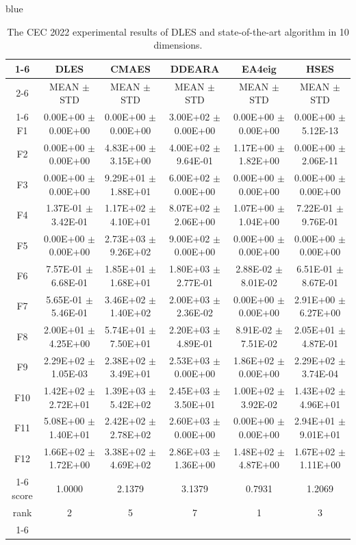 \documentclass[journal, onecolumn]{IEEEtran}
\begin{document}
\begin{color}{blue}
\begin{table}[htbp!]
	\centering
	\caption{The CEC 2022 experimental results of DLES and state-of-the-art algorithm in 10 dimensions.}
	\label{CEC2022_10}
		\begin{tabular}{c|ccccc}
			\cline{1-6}
				 &	DLES			 &	CMAES				 &	DDEARA				 &	EA4eig				 &	HSES			\\	\cline{2-6}	
			&	MEAN	$\pm$	STD	 &	MEAN	$\pm$	STD		 &	MEAN	$\pm$	STD		 &	MEAN	$\pm$	STD		 &	MEAN	$\pm$	STD	\\	\cline{1-6}
			F1	 &	0.00E+00	$\pm$	0.00E+00	 &	0.00E+00	$\pm$	0.00E+00		 &	3.00E+02	$\pm$	0.00E+00		 &	0.00E+00	$\pm$	0.00E+00		 &	0.00E+00	$\pm$	5.12E-13	\\	
			F2	 &	0.00E+00	$\pm$	0.00E+00	 &	4.83E+00	$\pm$	3.15E+00		 &	4.00E+02	$\pm$	9.64E-01		 &	1.17E+00	$\pm$	1.82E+00		 &	0.00E+00	$\pm$	2.06E-11	\\	
			F3	 &	0.00E+00	$\pm$	0.00E+00	 &	9.29E+01	$\pm$	1.88E+01		 &	6.00E+02	$\pm$	0.00E+00		 &	0.00E+00	$\pm$	0.00E+00		 &	0.00E+00	$\pm$	0.00E+00	\\	
			F4	 &	1.37E-01	$\pm$	3.42E-01	 &	1.17E+02	$\pm$	4.10E+01		 &	8.07E+02	$\pm$	2.06E+00		 &	1.07E+00	$\pm$	1.04E+00		 &	7.22E-01	$\pm$	9.76E-01	\\	
			F5	 &	0.00E+00	$\pm$	0.00E+00	 &	2.73E+03	$\pm$	9.26E+02		 &	9.00E+02	$\pm$	0.00E+00		 &	0.00E+00	$\pm$	0.00E+00		 &	0.00E+00	$\pm$	0.00E+00	\\	
			F6	 &	7.57E-01	$\pm$	6.68E-01	 &	1.85E+01	$\pm$	1.68E+01		 &	1.80E+03	$\pm$	2.77E-01		 &	2.88E-02	$\pm$	8.01E-02		 &	6.51E-01	$\pm$	8.67E-01	\\	
			F7	 &	5.65E-01	$\pm$	5.46E-01	 &	3.46E+02	$\pm$	1.40E+02		 &	2.00E+03	$\pm$	2.36E-02		 &	0.00E+00	$\pm$	0.00E+00		 &	2.91E+00	$\pm$	6.27E+00	\\	
			F8	 &	2.00E+01	$\pm$	4.25E+00	 &	5.74E+01	$\pm$	7.50E+01		 &	2.20E+03	$\pm$	4.89E-01		 &	8.91E-02	$\pm$	7.51E-02		 &	2.05E+01	$\pm$	4.87E-01	\\	
			F9	 &	2.29E+02	$\pm$	1.05E-03	 &	2.38E+02	$\pm$	3.49E+01		 &	2.53E+03	$\pm$	0.00E+00		 &	1.86E+02	$\pm$	0.00E+00		 &	2.29E+02	$\pm$	3.74E-04	\\	
			F10	 &	1.42E+02	$\pm$	2.72E+01	 &	1.39E+03	$\pm$	5.42E+02		 &	2.45E+03	$\pm$	3.50E+01		 &	1.00E+02	$\pm$	3.92E-02		 &	1.43E+02	$\pm$	4.96E+01	\\	
			F11	 &	5.08E+00	$\pm$	1.40E+01	 &	2.42E+02	$\pm$	2.78E+02		 &	2.60E+03	$\pm$	0.00E+00		 &	0.00E+00	$\pm$	0.00E+00		 &	2.94E+01	$\pm$	9.01E+01	\\	
			F12	 &	1.66E+02	$\pm$	1.72E+00	 &	3.38E+02	$\pm$	4.69E+02		 &	2.86E+03	$\pm$	1.36E+00		 &	1.48E+02	$\pm$	4.87E+00		 &	1.67E+02	$\pm$	1.11E+00	\\	\cline{1-6}	
			score		& 1.0000 & 2.1379 & 3.1379 & 0.7931 & 1.2069											\\												
			rank	 	 & 2 & 5 & 7 & 1 & 3											\\	\cline{1-6}											
			

\end{tabular}
\end{table}
\end{color}
\end{document}
